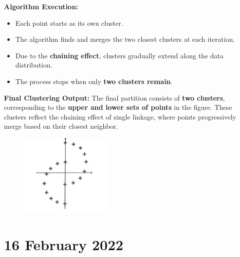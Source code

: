 \documentclass[a4paper,11pt,oneside]{book}
\begin{document}
\begin{enumerate}
\begin{solution}
                \textbf{Algorithm Execution:}
                \begin{itemize}
                    \item Each point starts as its own cluster.
                    \item The algorithm finds and merges the two closest clusters at each iteration.
                    \item Due to the \textbf{chaining effect}, clusters gradually extend along the data distribution.
                    \item The process stops when only \textbf{two clusters remain}.
                \end{itemize}
                
                \textbf{Final Clustering Output:}
                The final partition consists of \textbf{two clusters}, corresponding to the \textbf{upper and lower sets of points} in the figure. These clusters reflect the chaining effect of single linkage, where points progressively merge based on their closest neighbor.
            \end{solution}
            
        \begin{figure}[H]
            \centering
            \includegraphics[width=0.4\textwidth,height=0.6\textheight,keepaspectratio]{images/4_31_Jan_2023.png}
        \end{figure}
    
    \end{enumerate}




\chapter{16 February 2022}
\end{document}
